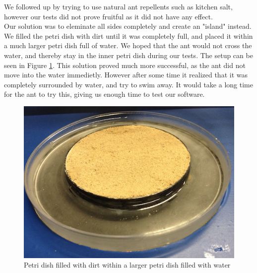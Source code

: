 We followed up by trying to use natural ant repellents such as kitchen salt, however our tests did not prove fruitful as it did not have any effect.\\

Our solution was to eleminate all sides completely and create an "island" instead. We filled the petri dish with dirt until it was completely full, and placed it within a much larger petri dish full of water. We hoped that the ant would not cross the water, and thereby stay in the inner petri dish during our tests. The setup can be seen in Figure \ref{fig:petridish}. This solution proved much more successful, as the ant did not move into the water immedietly. However after some time it realized that it was completely surrounded by water, and try to swim away. It would take a long time for the ant to try this, giving us enough time to test our software.\\

\begin{figure}[ht!]
  \centering
    \includegraphics[scale=0.25]{img/petridish}
  \caption{Petri dish filled with dirt within a larger petri dish filled with water}
  \label{fig:petridish}
\end{figure}